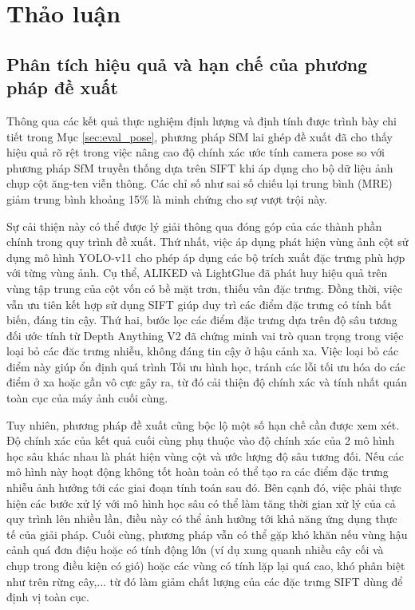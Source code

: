         
\section{Thảo luận}
\label{sec:discussion}
    \subsection{Phân tích hiệu quả và hạn chế của phương pháp đề xuất}
\label{subsec:discuss_proposed_method}

Thông qua các kết quả thực nghiệm định lượng và định tính được trình bày chi tiết trong Mục \ref{sec:eval_pose}, phương pháp SfM lai ghép đề xuất đã cho thấy hiệu quả rõ rệt trong việc nâng cao độ chính xác ước tính camera pose so với phương pháp SfM truyền thống dựa trên SIFT khi áp dụng cho bộ dữ liệu ảnh chụp cột ăng-ten viễn thông. Các chỉ số như sai số chiếu lại trung bình (MRE) giảm trung bình khoảng 15\% là minh chứng cho sự vượt trội này. 

Sự cải thiện này có thể được lý giải thông qua đóng góp của các thành phần chính trong quy trình đề xuất. Thứ nhất, việc áp dụng phát hiện vùng ảnh cột sử dụng mô hình YOLO-v11 cho phép áp dụng các bộ trích xuất đặc trưng phù hợp với từng vùng ảnh. Cụ thể, ALIKED và LightGlue đã phát huy hiệu quả trên vùng tập trung của cột vốn có bề mặt trơn, thiếu vân đặc trưng. Đồng thời, việc vẫn ưu tiên kết hợp sử dụng SIFT giúp duy trì các điểm đặc trưng có tính bất biến, đáng tin cậy. Thứ hai, bước lọc các điểm đặc trưng dựa trên độ sâu tương đối ước tính từ Depth Anything V2 đã chứng minh vai trò quan trọng trong việc loại bỏ các đăc trưng nhiễu, không đáng tin cậy ở hậu cảnh xa. Việc loại bỏ các điểm này giúp ổn định quá trình Tối ưu hình học, tránh các lỗi tối ưu hóa do các điểm ở xa hoặc gần vô cực gây ra, từ đó cải thiện độ chính xác và tính nhất quán toàn cục của máy ảnh cuối cùng.

Tuy nhiên, phương pháp đề xuất cũng bộc lộ một số hạn chế cần được xem xét. Độ chính xác của kết quả cuối cùng phụ thuộc vào độ chính xác của 2 mô hình học sâu khác nhau là phát hiện vùng cột và ước lượng độ sâu tương đối. Nếu các mô hình này hoạt động không tốt hoàn toàn có thể tạo ra các điểm đặc trưng nhiễu ảnh hưởng tới các giai đoạn tính toán sau đó. Bên cạnh đó, việc phải thực hiện các bước xử lý với mô hình học sâu có thể làm tăng thời gian xử lý của cả quy trình lên nhiều lần, điều này có thể ảnh hưởng tới khả năng ứng dụng thực tế của giải pháp. Cuối cùng, phương pháp vẫn có thể gặp khó khăn nếu vùng hậu cảnh quá đơn điệu hoặc có tính động lớn (ví dụ xung quanh nhiều cây cối và chụp trong điều kiện có gió) hoặc các vùng có tính lặp lại quá cao, khó phân biệt như trên rừng cây,... từ đó làm giảm chất lượng của các đặc trưng SIFT dùng để định vị toàn cục.

